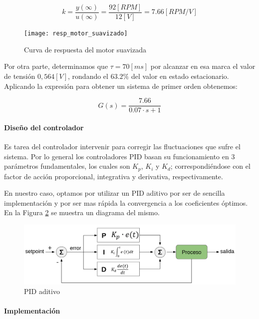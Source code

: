 $$ k=\frac{y(\infty)}{u(\infty)}=\frac{92[RPM]}{12[V]}=7.66[RPM/V] $$

\begin{figure}[H]
    \centering
    \texttt{[image: resp\_motor\_suavizado]}
    \caption{Curva de respuesta del motor suavizada}
    \label{fig:curvarespmotorsuaviz}
\end{figure}

Por otra parte, determinamos que $\tau=70[ms]$ por alcanzar en esa marca el valor de tensión $0,564[V]$, rondando el $63.2\%$ del valor en estado estacionario. Aplicando la expresión para obtener un sistema de primer orden obtenemos:

$$ G(s) = \frac{7.66}{0.07 \cdot s + 1} $$


\paragraph{Diseño del controlador} \mbox{} \vspace{8pt}

Es tarea del controlador intervenir para corregir las fluctuaciones que sufre el sistema. Por lo general los controladores PID basan su funcionamiento en 3 parámetros fundamentales, los cuales son $K_p$, $K_i$ y $K_d$; correspondiéndose con el factor de acción proporcional, integrativa y derivativa, respectivamente.

En nuestro caso, optamos por utilizar un PID aditivo por ser de sencilla implementación y por ser mas rápida la convergencia a los coeficientes óptimos. En la Figura \ref{fig:pidaditivo} se muestra un diagrama del mismo.

\begin{figure}[H]
    \centering
    \includegraphics[width=0.9\linewidth]{images/pid_aditivo}
    \caption{PID aditivo}
    \label{fig:pidaditivo}
\end{figure}

\paragraph{Implementación} \mbox{} \vspace{8pt}

